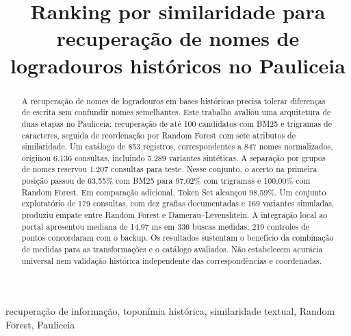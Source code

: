 \documentclass[conference]{IEEEtran}
\begin{document}
\title{Ranking por similaridade para recuperação de nomes de logradouros históricos no Pauliceia}
\author{
\and
{}
}
\maketitle

\begin{abstract}
A recuperação de nomes de logradouros em bases históricas precisa tolerar diferenças de escrita sem confundir nomes semelhantes. Este trabalho avaliou uma arquitetura de duas etapas no Pauliceia: recuperação de até 100 candidatos com BM25 e trigramas de caracteres, seguida de reordenação por Random Forest com sete atributos de similaridade. Um catálogo de 853 registros, correspondentes a 847 nomes normalizados, originou 6.136 consultas, incluindo 5.289 variantes sintéticas. A separação por grupos de nomes reservou 1.207 consultas para teste. Nesse conjunto, o acerto na primeira posição passou de 63,55\% com BM25 para 97,02\% com trigramas e 100,00\% com Random Forest. Em comparação adicional, Token Set alcançou 98,59\%. Um conjunto exploratório de 179 consultas, com dez grafias documentadas e 169 variantes simuladas, produziu empate entre Random Forest e Damerau--Levenshtein. A integração local ao portal apresentou mediana de 14,97 ms em 336 buscas medidas; 219 controles de pontos concordaram com o backup. Os resultados sustentam o benefício da combinação de medidas para as transformações e o catálogo avaliados. Não estabelecem acurácia universal nem validação histórica independente das correspondências e coordenadas.
\end{abstract}

\begin{IEEEkeywords}
recuperação de informação, toponímia histórica, similaridade textual, Random Forest, Pauliceia
\end{IEEEkeywords}









\end{document}
